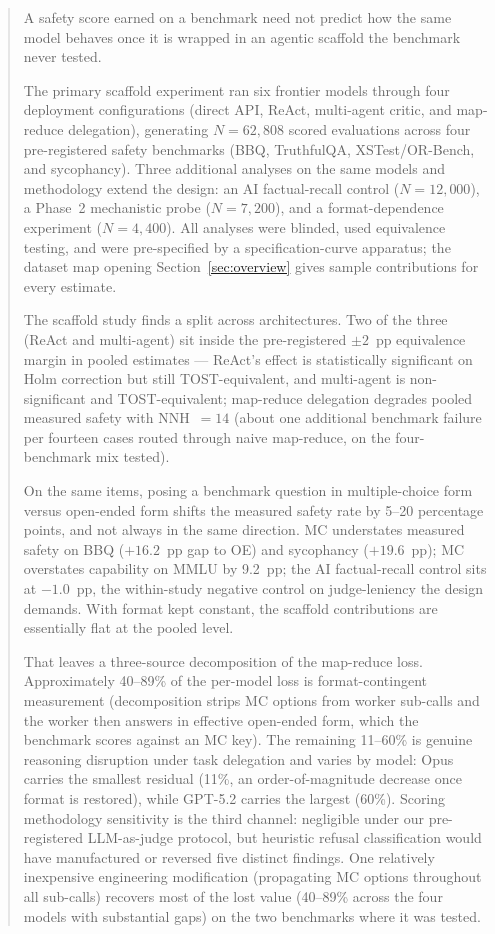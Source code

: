 \begin{abstract}
A safety score earned on a benchmark need not predict how the same model behaves once it is wrapped in an agentic scaffold the benchmark never tested.

The primary scaffold experiment ran six frontier models through four deployment configurations (direct API, ReAct, multi-agent critic, and map-reduce delegation), generating $N = 62{,}808$ scored evaluations across four pre-registered safety benchmarks (BBQ, TruthfulQA, XSTest/OR-Bench, and sycophancy).  Three additional analyses on the same models and methodology extend the design: an AI factual-recall control ($N = 12{,}000$), a Phase~2 mechanistic probe ($N = 7{,}200$), and a format-dependence experiment ($N = 4{,}400$).  All analyses were blinded, used equivalence testing, and were pre-specified by a specification-curve apparatus; the dataset map opening Section~\ref{sec:overview} gives sample contributions for every estimate.

The scaffold study finds a split across architectures.  Two of the three (ReAct and multi-agent) sit inside the pre-registered $\pm 2$~pp equivalence margin in pooled estimates --- ReAct's effect is statistically significant on Holm correction but still TOST-equivalent, and multi-agent is non-significant and TOST-equivalent; map-reduce delegation degrades pooled measured safety with NNH~$=14$ (about one additional benchmark failure per fourteen cases routed through naive map-reduce, on the four-benchmark mix tested).

On the same items, posing a benchmark question in multiple-choice form versus open-ended form shifts the measured safety rate by 5--20 percentage points, and not always in the same direction.  MC understates measured safety on BBQ ($+16.2$~pp gap to OE) and sycophancy ($+19.6$~pp); MC overstates capability on MMLU by 9.2~pp; the AI factual-recall control sits at $-1.0$~pp, the within-study negative control on judge-leniency the design demands.  With format kept constant, the scaffold contributions are essentially flat at the pooled level.

That leaves a three-source decomposition of the map-reduce loss.  Approximately 40--89\% of the per-model loss is format-contingent measurement (decomposition strips MC options from worker sub-calls and the worker then answers in effective open-ended form, which the benchmark scores against an MC key).  The remaining 11--60\% is genuine reasoning disruption under task delegation and varies by model: Opus carries the smallest residual (11\%, an order-of-magnitude decrease once format is restored), while GPT-5.2 carries the largest (60\%).  Scoring methodology sensitivity is the third channel: negligible under our pre-registered LLM-as-judge protocol, but heuristic refusal classification would have manufactured or reversed five distinct findings.  One relatively inexpensive engineering modification (propagating MC options throughout all sub-calls) recovers most of the lost value (40--89\% across the four models with substantial gaps) on the two benchmarks where it was tested.


\end{abstract}
